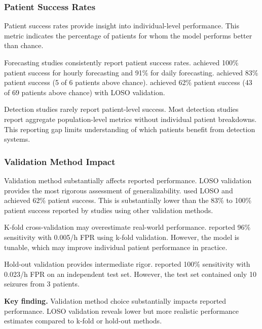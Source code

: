 \subsubsection{Patient Success Rates}

Patient success rates provide insight into individual-level performance. This metric indicates the percentage of patients for whom the model performs better than chance.

Forecasting studies consistently report patient success rates. \textcite{stirlingForecastingSeizureLikelihood2021} achieved 100\% patient success for hourly forecasting and 91\% for daily forecasting. \textcite{nasseriAmbulatorySeizureForecasting2021} achieved 83\% patient success (5 of 6 patients above chance). \textcite{meiselMachineLearningWristband2020} achieved 62\% patient success (43 of 69 patients above chance) with LOSO validation.

Detection studies rarely report patient-level success. Most detection studies report aggregate population-level metrics without individual patient breakdowns. This reporting gap limits understanding of which patients benefit from detection systems.

\subsubsection{Validation Method Impact}

Validation method substantially affects reported performance. LOSO validation provides the most rigorous assessment of generalizability. \textcite{meiselMachineLearningWristband2020} used LOSO and achieved 62\% patient success. This is substantially lower than the 83\% to 100\% patient success reported by studies using other validation methods.

K-fold cross-validation may overestimate real-world performance. \textcite{spahrDeepLearningbasedDetection2025} reported 96\% sensitivity with 0.005/h FPR using k-fold validation. However, the model is tunable, which may improve individual patient performance in practice.

Hold-out validation provides intermediate rigor. \textcite{fineDetectionKeyAutomated2025} reported 100\% sensitivity with 0.023/h FPR on an independent test set. However, the test set contained only 10 seizures from 3 patients.

\textbf{Key finding.} Validation method choice substantially impacts reported performance. LOSO validation reveals lower but more realistic performance estimates compared to k-fold or hold-out methods.
